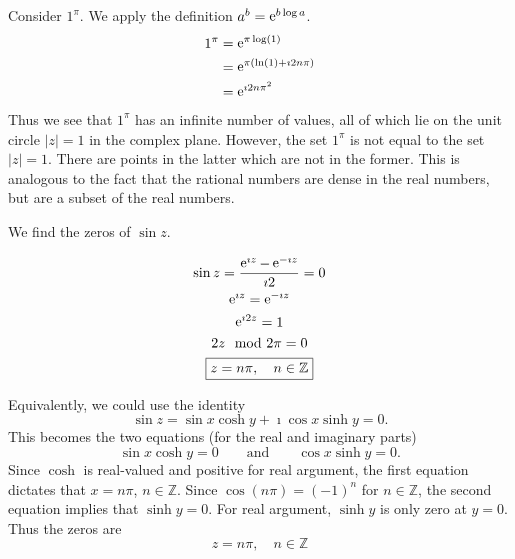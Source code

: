 \begin{Example}
  Consider $1^\pi$.  We apply the definition $a^b = \mathop{\mathrm{e}}\nolimits^{b \log a}$.
  \begin{align*}
    1^\pi    
    &= \mathop{\mathrm{e}}\nolimits^{\pi \log(1)} 
    \\
    &= \mathop{\mathrm{e}}\nolimits^{\pi (\ln(1) + \imath 2 n \pi)} 
    \\
    &= \mathop{\mathrm{e}}\nolimits^{\imath 2 n \pi^2} 
  \end{align*}
  Thus we see that $1^\pi$ has an infinite number of values, all of which
  lie on the unit circle $|z| = 1$ in the complex plane.  However, the set
  $1^\pi$ is not equal to the set $|z| = 1$.  There are points in the 
  latter which are not in the former.  This is analogous to the fact
  that the rational numbers are dense in the real numbers, but are a 
  subset of the real numbers.
\end{Example}







\begin{Example}
  We find the zeros of $\sin z$.

  \begin{gather*}
    \sin z = \frac{\mathop{\mathrm{e}}\nolimits^{\imath z} - \mathop{\mathrm{e}}\nolimits^{-\imath z}}{\imath 2} = 0 
    \\
    \mathop{\mathrm{e}}\nolimits^{\imath z} = \mathop{\mathrm{e}}\nolimits^{-\imath z} 
    \\
    \mathop{\mathrm{e}}\nolimits^{\imath 2 z} = 1 
    \\
    2 z \mod 2 \pi = 0 
    \\
    \boxed{ 
      z = n \pi, \quad n \in \mathbb{Z} 
      }
  \end{gather*}

  Equivalently, we could use the identity
  \[ 
  \sin z = \sin x \cosh y + \imath \cos x \sinh y = 0. 
  \]
  This becomes the two equations (for the real and imaginary parts)
  \[ 
  \sin x \cosh y = 0 \qquad \mathrm{and} \qquad \cos x \sinh y = 0. 
  \]
  Since $\cosh$ is real-valued and positive for real argument, 
  the first equation dictates that $x = n \pi$, $n \in \mathbb{Z}$. 
  Since $\cos(n \pi) = (-1)^n$ for $n \in \mathbb{Z}$, the second equation
  implies that $\sinh y = 0$.  For real argument, $\sinh y$ is only zero at
  $y = 0$.  Thus the zeros are
  \[ 
  \boxed{ 
    z = n \pi, \quad n \in \mathbb{Z} 
    } 
  \]
\end{Example}








